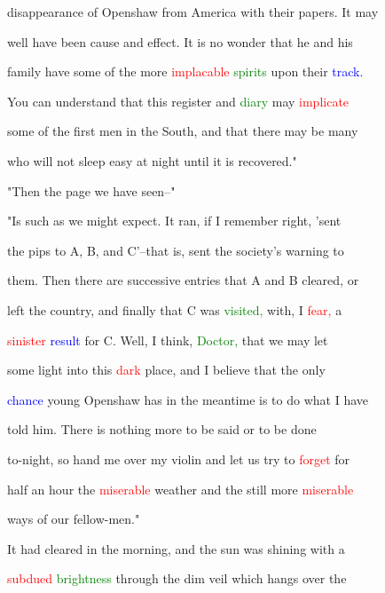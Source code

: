  disappearance of Openshaw from America with their papers. It may

 well have been cause and effect. It is no wonder that he and his

 family have some of the more \textcolor{red}{implacable} \textcolor{green}{spirits} upon their \textcolor{blue}{track.}

 You can understand that this register and \textcolor{green}{diary} may \textcolor{red}{implicate}

 some of the first men in the South, and that there may be many

 who will not sleep easy at night until it is recovered."



 "Then the page we have seen--"



 "Is such as we might \textcolor{BurntOrange}{expect.} It ran, if I remember right, 'sent

 the pips to A, B, and C'--that is, sent the society's \textcolor{BurntOrange}{warning} to

 them. Then there are successive entries that A and B cleared, or

 left the country, and \textcolor{BurntOrange}{finally} that C was \textcolor{green}{visited,} with, I \textcolor{red}{fear,} a

 \textcolor{red}{sinister} \textcolor{blue}{result} for C. Well, I think, \textcolor{green}{Doctor,} that we may let

 some light into this \textcolor{red}{dark} place, and I believe that the only

 \textcolor{blue}{chance} \textcolor{BurntOrange}{young} Openshaw has in the meantime is to do what I have

 told him. There is nothing more to be said or to be done

 to-night, so hand me over my violin and let us try to \textcolor{red}{forget} for

 half an hour the \textcolor{red}{miserable} weather and the still more \textcolor{red}{miserable}

 ways of our fellow-men."





 It had cleared in the morning, and the \textcolor{BurntOrange}{sun} was shining with a

 \textcolor{red}{subdued} \textcolor{green}{brightness} through the dim veil which hangs over the

